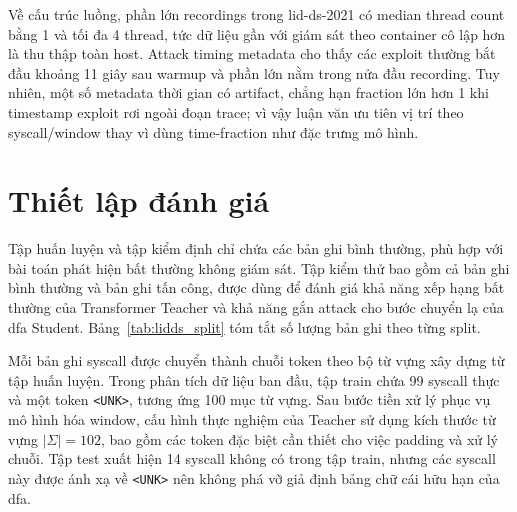 \documentclass[../main.tex]{subfiles}
\begin{document}
Về cấu trúc luồng, phần lớn recordings trong \gls{lid-ds}-2021 có median
thread count bằng 1
và tối đa 4 thread, tức dữ liệu gần với giám sát theo container cô
lập hơn là thu thập
toàn host. Attack timing metadata cho thấy các exploit thường bắt đầu
khoảng 11 giây sau
warmup và phần lớn nằm trong nửa đầu recording. Tuy nhiên, một số
metadata thời gian có
artifact, chẳng hạn fraction lớn hơn 1 khi timestamp exploit rơi
ngoài đoạn trace; vì
vậy luận văn ưu tiên vị trí theo \gls{syscall}/window thay vì dùng
time-fraction như đặc trưng
mô hình.

\section{Thiết lập đánh giá}
\label{sec:eval_setup}

Tập huấn luyện và tập kiểm định chỉ chứa các bản ghi bình thường, phù
hợp với bài toán
phát hiện bất thường không giám sát. Tập kiểm thử bao gồm cả bản ghi
bình thường và bản
ghi tấn công, được dùng để đánh giá khả năng xếp hạng bất thường của
Transformer Teacher
và khả năng gắn attack cho bước chuyển lạ của \gls{dfa} Student.
Bảng~\ref{tab:lidds_split} tóm tắt
số lượng bản ghi theo từng split.

\begin{table}[H]
  \caption{Phân chia bản ghi trong LID-DS-2021 được sử dụng trong thực nghiệm.}
  \label{tab:lidds_split}
  \centering
\end{table}

Mỗi bản ghi \gls{syscall} được chuyển thành chuỗi token theo bộ từ vựng xây
dựng từ tập huấn
luyện. Trong phân tích dữ liệu ban đầu, tập train chứa 99 \gls{syscall}
thực và một token
\texttt{<UNK>}, tương ứng 100 mục từ vựng. Sau bước tiền xử lý phục
vụ mô hình hóa
window, cấu hình thực nghiệm của Teacher sử dụng kích thước từ vựng
$|\Sigma| = 102$,
bao gồm các token đặc biệt cần thiết cho việc padding và xử lý chuỗi.
Tập test xuất
hiện 14 \gls{syscall} không có trong tập train, nhưng các \gls{syscall} này được ánh xạ về
\texttt{<UNK>} nên không phá vỡ giả định bảng chữ cái hữu hạn của \gls{dfa}.
\end{document}

